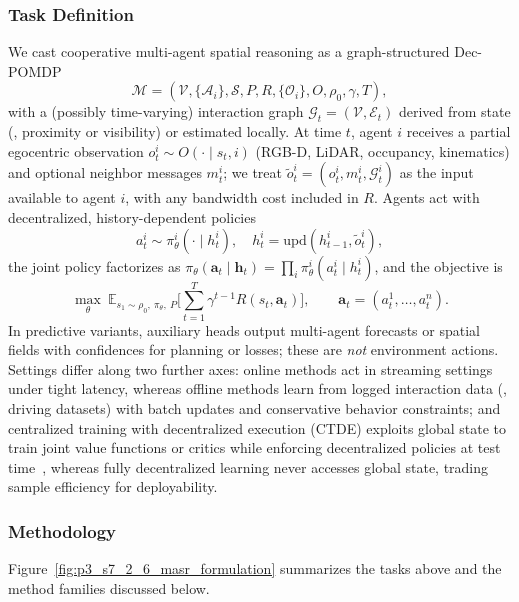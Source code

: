 \subsubsection{Task Definition}
We cast cooperative multi-agent spatial reasoning as a graph-structured Dec-POMDP
\begin{equation}
\mathcal{M}=(\mathcal{V},\{\mathcal{A}_i\},\mathcal{S},P,R,\{\mathcal{O}_i\},O,\rho_0,\gamma,T),
\end{equation}
with a (possibly time-varying) interaction graph $\mathcal{G}_t=(\mathcal{V},\mathcal{E}_t)$ derived from state (\eg, proximity or visibility) or estimated locally.
At time $t$, agent $i$ receives a partial egocentric observation $o_t^i\!\sim\!O(\cdot\mid s_t,i)$ (RGB-D, LiDAR, occupancy, kinematics) and optional neighbor messages $m_t^i$; we treat $\tilde{o}_t^i=(o_t^i,m_t^i,\mathcal{G}_t^i)$ as the input available to agent $i$, with any bandwidth cost included in $R$.
Agents act with decentralized, history-dependent policies
\begin{equation}
a_t^i \sim \pi_\theta^i(\cdot \mid h_t^i),\quad
h_t^i=\mathrm{upd}(h_{t-1}^i,\tilde{o}_t^i),
\end{equation}
the joint policy factorizes as $\pi_\theta(\mathbf a_t\mid \mathbf h_t)=\prod_i \pi_\theta^i(a_t^i\mid h_t^i)$, and the objective is
\begin{equation}
\max_{\theta}\ \mathbb{E}_{s_1\sim\rho_0,\ \pi_\theta,\ P}
\Big[\sum_{t=1}^{T}\gamma^{t-1}R(s_t,\mathbf a_t)\Big],\qquad \mathbf a_t=(a_t^1,\dots,a_t^n).
\end{equation}
In predictive variants, auxiliary heads output multi-agent forecasts or spatial fields with confidences for planning or losses; these are \emph{not} environment actions.
Settings differ along two further axes: online methods act in streaming settings under tight latency, whereas offline methods learn from logged interaction data (\eg, driving datasets) with batch updates and conservative behavior constraints; and centralized training with decentralized execution (CTDE) exploits global state to train joint value functions or critics while enforcing decentralized policies at test time~\cite{foerster2018coma,rashid2018qmix}, whereas fully decentralized learning never accesses global state, trading sample efficiency for deployability.


\subsubsection{Methodology}
Figure~\ref{fig:p3_s7_2_6_masr_formulation} summarizes the tasks above and the method families discussed below.

